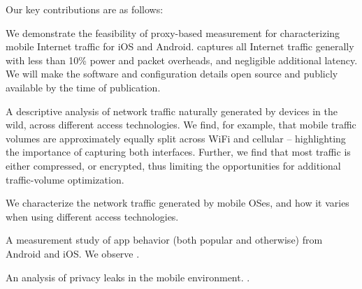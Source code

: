 Our key contributions are as follows:
\begin{packeditemize}
\item We demonstrate the feasibility of proxy-based measurement for characterizing mobile Internet traffic for iOS and Android. 
\platname captures all Internet traffic generally with less than 10\% power and packet overheads, and negligible additional latency. 
We will make the \platname software and configuration details open source and publicly available by the time of publication.
\item A descriptive analysis of network traffic naturally generated by devices in the wild, across different access technologies. 
We find, for example, that mobile traffic volumes are approximately equally split across WiFi and cellular -- highlighting the importance of capturing both interfaces. 
Further, we find that most traffic is either compressed, or encrypted, thus limiting the opportunities for additional traffic-volume optimization.
\item We characterize the network traffic generated by mobile OSes, and how it varies when using different access technologies.
\item A measurement study of app behavior (both popular and otherwise) from Android and iOS. We observe . 
\item An analysis of privacy leaks in the mobile environment. .
\item {}
\end{packeditemize}
